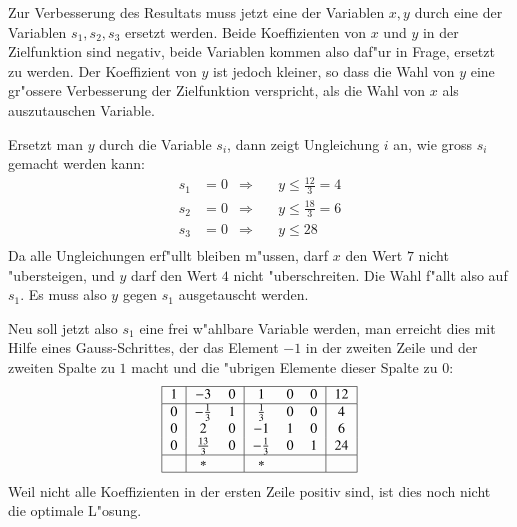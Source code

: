 Zur Verbesserung des Resultats muss jetzt eine der Variablen $x,y$
durch eine der Variablen $s_1,s_2, s_3$ ersetzt werden. Beide
Koeffizienten von $x$ und $y$ in der Zielfunktion sind negativ, 
beide Variablen kommen also daf"ur in Frage, ersetzt zu werden.
Der Koeffizient von $y$ ist jedoch kleiner, so dass die Wahl von $y$
eine gr"ossere Verbesserung der Zielfunktion verspricht, als die
Wahl von $x$ als auszutauschen Variable.

Ersetzt man $y$ durch die Variable $s_i$, dann zeigt Ungleichung
$i$ an, wie gross $s_i$ gemacht werden kann:
\begin{align*}
s_1&=0&\Rightarrow&\quad y\le \frac{12}3=4
\\
s_2&=0&\Rightarrow&\quad y\le \frac{18}3=6
\\
s_3&=0&\Rightarrow&\quad y\le 28
\\
\end{align*}
Da alle Ungleichungen erf"ullt bleiben m"ussen, darf $x$ den Wert $7$
nicht "ubersteigen, und $y$ darf den Wert $4$ nicht "uberschreiten.
Die Wahl f"allt also auf $s_1$.
Es muss also $y$ gegen $s_1$ ausgetauscht werden.

Neu soll jetzt also $s_1$ eine frei w"ahlbare Variable werden, man
erreicht dies mit Hilfe eines Gauss-Schrittes, der das Element $-1$
in der zweiten Zeile und der zweiten Spalte zu $1$ macht und die "ubrigen
Elemente dieser Spalte zu $0$:
\[
\begin{tabular}{|>{$}c<{$}|>{$}c<{$}>{$}c<{$}|>{$}c<{$}>{$}c<{$}>{$}c<{$}|>{$}c<{$}|}
\hline
1&        -3& 0&       1& 0& 0& 12\\
\hline
0&  -\frac13& 1& \frac13& 0& 0&  4\\
0&         2& 0&      -1& 1& 0&  6\\
0&\frac{13}3& 0&-\frac13& 0& 1& 24\\
\hline
 & *&  & *&  &  &  \\
\hline
\end{tabular}
\]
Weil nicht alle Koeffizienten in der ersten Zeile positiv sind,
ist dies noch nicht die optimale L"osung.

